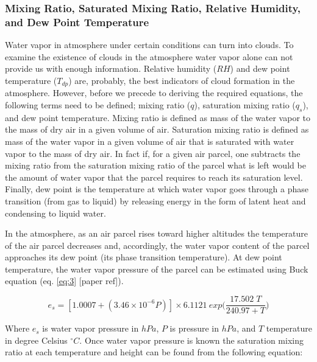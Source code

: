 \documentclass[a4paper,12pt]{article}
\numberwithin{equation}{section} %
\begin{document}
\subsubsection{Mixing Ratio, Saturated Mixing Ratio, Relative Humidity, and Dew Point Temperature}

Water vapor in atmosphere under certain conditions can turn into clouds. To examine the existence of clouds in the atmosphere water vapor alone can not provide us with enough information. Relative humidity ($RH$) and dew point temperature ($T_{dp}$) are, probably, the best indicators of cloud formation in the atmosphere. However, before we precede to deriving the required equations, the following terms need to be defined; mixing ratio ($q$), saturation mixing ratio ($q_s$), and dew point temperature. Mixing ratio is defined as mass of the water vapor to the mass of dry air in a given volume of air. Saturation mixing ratio is defined as mass of the water vapor in a given volume of air that is saturated with water vapor to the mass of dry air. In fact if, for a given air parcel, one subtracts the mixing ratio from the saturation mixing ratio of the parcel what is left would be the amount of water vapor that the parcel requires to reach its saturation level. Finally, dew point is the temperature at which water vapor goes through a phase transition (from gas to liquid) by releasing energy in the form of latent heat and condensing to liquid water.

In the atmosphere, as an air parcel rises toward higher altitudes the temperature of the air parcel decreases and, accordingly, the water vapor content of the parcel approaches its dew point (its phase transition temperature). %
At dew point temperature, the water vapor pressure of the parcel can be estimated using Buck equation (eq. \ref{eq:3} [paper ref]). 

\vspace{0.25cm}
\begin{equation}\label{eq:3}
e_s = [1.0007 + (3.46 \times 10^{-6} P)] \times 6.1121 \: exp\Big(\frac{17.502\; T}{240.97 + T}\Big)
\end{equation}
\vspace{0.25cm}

Where $e_s$ is water vapor pressure in $hPa$, $P$ is pressure in $hPa$, and $T$ temperature in degree Celsius $^\circ C$.
Once water vapor pressure is known the saturation mixing ratio at each temperature and height can be found from the following equation:
\end{document}
